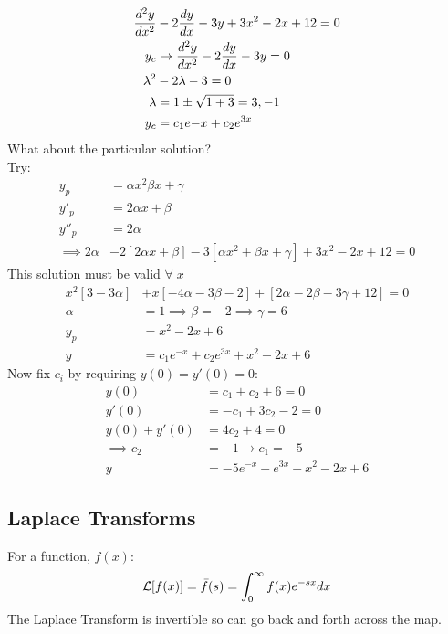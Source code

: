 \documentclass[Maths.tex]{subfiles}
\begin{document}
\chapter{}
\begin{example}
\begin{align*}
    \frac{d^2 y}{dx^2} &- 2\frac{dy}{dx} - 3y + 3x^2 - 2x + 12 = 0 \\
    y_c &\to \frac{d^2 y}{dx^2} -2\frac{dy}{dx} -3y = 0 \\
    \lambda^2 &- 2\lambda - 3 = 0 \\
    \lambda &= 1 \pm \sqrt{1 + 3} = 3,-1 \\
    y_c &= c_1e{-x} + c_2e^{3x}
\end{align*}
What about the particular solution? \\
Try:
\begin{align*}
    y_p &= \alpha x^2 \beta x + \gamma \\
    y'_p &= 2\alpha x + \beta \\
    y''_p &= 2\alpha \\
    \implies 2\alpha & -2[2\alpha x + \beta] - 3[\alpha x^2 + \beta x + \gamma] + 3x^2 - 2x + 12 = 0
\end{align*}
This solution must be valid $\forall\; x$
\begin{align*}
    x^2[3 - 3\alpha] &+ x[-4\alpha - 3\beta - 2] + [2\alpha -2\beta -3\gamma + 12] =  0 \\
    \alpha &= 1 \implies \beta = -2 \implies \gamma = 6 \\
    y_p &= x^2 - 2x + 6 \\
    y &= c_1e^{-x} + c_2e^{3x} + x^2 - 2x + 6
\end{align*}
Now fix $c_i$ by requiring $y(0) = y'(0) = 0$:
\begin{align*}
    y(0) &= c_1 + c_2 + 6 = 0 \\
    y'(0) &= -c_1 + 3c_2 - 2 = 0 \\
    y(0) + y'(0) &= 4c_2 + 4 = 0 \\
    \implies c_2 &= -1 \to c_1 = -5 \\
    y &= -5e^{-x} - e^{3x} + x^2 -2x + 6
\end{align*}
\end{example}

\section{Laplace Transforms}
For a function, $f(x)$:
\begin{align*}
    \mathcal{L}[f(x)] = \bar{f}(s) = \int_{0}^{\infty} f(x) e^{-sx}dx
\end{align*}
The Laplace Transform is invertible so can go back and forth across the map.
\end{document}
